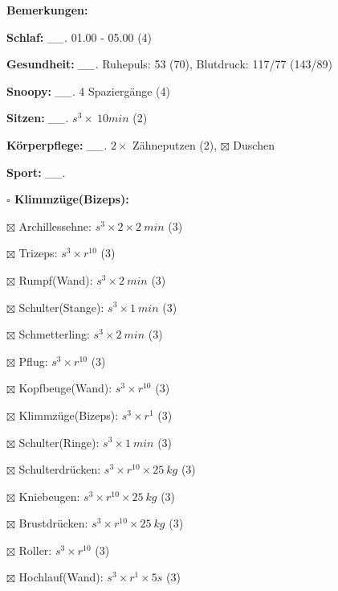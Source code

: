 \documentclass[10pt,a4paper]{article}
\newcommand\prop[1] {{\color {alizarin} {\bf #1}}}             %
\newcommand\mand[1] {{\color {burntorange} {\bf #1}}}          %
\newcommand\topspace{\vskip -15pt \hskip 20pt}
\newcommand\n[1] { {\sl #1.} \hskip 5pt }
\begin{document}
\begin{mdframed}[style=daystyle]
  \begin{labeling}{{\mand {Bemerkungen:}}}
    \setlength\itemsep{-3pt}
  \item[{\mand {Schlaf:}}]        \n{\_\_} 01.00 - 05.00 (4)
  \item[{\mand {Gesundheit:}}]    \n{\_\_} Ruhepuls: 53 (70), Blutdruck: 117/77 (143/89)
  \item[{\mand {Snoopy:}}]        \n{\_\_} 4 Spaziergänge (4)
  \item[{\mand {Sitzen:}}]        \n{\_\_} $s^3 \times\ 10 min$ (2)
  \item[{\mand {Körperpflege:}}]  \n{\_\_} $2 \times$ Zähneputzen (2), $\boxtimes$ Duschen
  \item[{\mand {Sport:}}]         \n{\_\_}
    \topspace
    \begin{minipage}{0.75\textwidth}  
      \begin{labeling}{\prop {$\square$ {Klimmzüge(Bizeps):}}}
        \setlength\itemsep{-3pt}
      \item[$\boxtimes$ Archillessehne:]    $s^3 \times 2 \times 2\ min$ (3)
      \item[$\boxtimes$ Trizeps:]           $s^3 \times r^{10}$ (3)
      \item[$\boxtimes$ Rumpf(Wand):]       $s^3 \times 2\ min$ (3)
      \item[$\boxtimes$ Schulter(Stange):]  $s^3 \times 1\ min$ (3)
      \item[$\boxtimes$ Schmetterling:]     $s^3 \times 2\ min$ (3)
      \item[$\boxtimes$ Pflug:]             $s^3 \times r^{10}$ (3)
      \item[$\boxtimes$ Kopfbeuge(Wand):]   $s^3 \times r^{10}$ (3)
      \item[$\boxtimes$ Klimmzüge(Bizeps):] $s^3 \times r^1$ (3)
      \item[$\boxtimes$ Schulter(Ringe):]   $s^3 \times 1\ min$ (3)
      \item[$\boxtimes$ Schulterdrücken:]   $s^3 \times r^{10} \times 25\ kg$ (3)
      \item[$\boxtimes$ Kniebeugen:]        $s^3 \times r^{10} \times 25\ kg$ (3)
      \item[$\boxtimes$ Brustdrücken:]      $s^3 \times r^{10} \times 25\ kg$ (3)
      \item[$\boxtimes$ Roller:]            $s^3 \times r^{10}$ (3)
      \item[$\boxtimes$ Hochlauf(Wand):]    $s^3 \times r^{1} \times 5s$ (3)

\end{labeling}
\end{minipage}
\end{labeling}
\end{mdframed}
\end{document}
